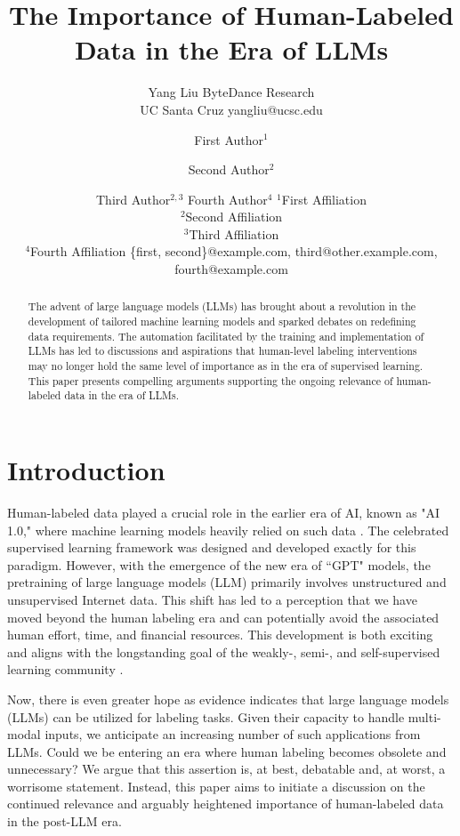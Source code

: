 \documentclass{article}
\title{The Importance of Human-Labeled Data in the Era of LLMs}
\author{
    Yang Liu
    \affiliations
   ByteDance Research \\
   UC Santa Cruz
    \emails
    yangliu@ucsc.edu
}
\author{
First Author$^1$
\and
Second Author$^2$\and
Third Author$^{2,3}$\And
Fourth Author$^4$
\affiliations
$^1$First Affiliation\\
$^2$Second Affiliation\\
$^3$Third Affiliation\\
$^4$Fourth Affiliation
\emails
\{first, second\}@example.com,
third@other.example.com,
fourth@example.com
}
\begin{document}
\maketitle

\begin{abstract}


The advent of large language models (LLMs) has brought about a revolution in the development of tailored machine learning models and sparked debates on redefining data requirements. The automation facilitated by the training and implementation of LLMs has led to discussions and aspirations that human-level labeling interventions may no longer hold the same level of importance as in the era of supervised learning.
This paper presents compelling arguments supporting the ongoing relevance of human-labeled data in the era of LLMs.
\end{abstract}

\section{Introduction}

Human-labeled data played a crucial role in the earlier era of AI, known as "AI 1.0," where machine learning models heavily relied on such data  \cite{deng2009imagenet}. The celebrated supervised learning framework \cite{vapnik1999overview,lecun2015deep} was designed and developed exactly for this paradigm. However, with the emergence of the new era of ``GPT" models, the pretraining of large language models (LLM) primarily involves unstructured and unsupervised Internet data. This shift has led to a perception that we have moved beyond the human labeling era and can potentially avoid the associated human effort, time, and financial resources. This development is both exciting and aligns with the longstanding goal of the weakly-, semi-, and self-supervised learning community \cite{zhu2005semi,zhou2018brief,gui2023survey,balestriero2023cookbook}. 

Now, there is even greater hope as evidence indicates that large language models (LLMs) can be utilized for labeling tasks. Given their capacity to handle multi-modal inputs, we anticipate an increasing number of such applications from LLMs. Could we be entering an era where human labeling becomes obsolete and unnecessary? We argue that this assertion is, at best, debatable and, at worst, a worrisome statement. Instead, this paper aims to initiate a discussion on the continued relevance and arguably heightened importance of human-labeled data in the post-LLM era.
\end{document}
